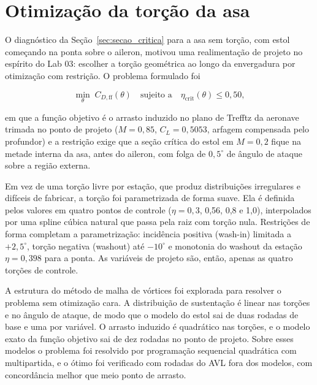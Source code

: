 \newpage
\section{Otimização da torção da asa}\label{sec:torcao}

O diagnóstico da Seção~\ref{sec:secao_critica} para a asa sem torção, com
estol começando na ponta sobre o aileron, motivou uma realimentação de
projeto no espírito do Lab 03: escolher a torção geométrica ao longo da
envergadura por otimização com restrição. O problema formulado foi

\begin{equation*}
    \min_{\theta}\; C_{D,\mathrm{ff}}(\theta)
    \quad \text{sujeito a} \quad
    \eta_{\mathrm{crit}}(\theta) \leq 0{,}50,
\end{equation*}

em que a função objetivo é o arrasto induzido no plano de Trefftz da
aeronave trimada no ponto de projeto ($M = 0{,}85$, $C_L = 0{,}5053$,
arfagem compensada pelo profundor) e a restrição exige que a seção crítica
do estol em $M = 0{,}2$ fique na metade interna da asa, antes do aileron,
com folga de $0{,}5^\circ$ de ângulo de ataque sobre a região externa.

Em vez de uma torção livre por estação, que produz distribuições
irregulares e difíceis de fabricar, a torção foi parametrizada de forma
suave. Ela é definida pelos valores em quatro pontos de controle
($\eta = 0{,}3$, 0,56, 0,8 e 1,0), interpolados por uma spline cúbica
natural que passa pela raiz com torção nula. Restrições de forma completam
a parametrização: incidência positiva (wash-in) limitada a $+2{,}5^\circ$,
torção negativa (washout) até $-10^\circ$ e monotonia do washout da
estação $\eta = 0{,}398$ para a ponta. As variáveis de projeto são, então,
apenas as quatro torções de controle.

A estrutura do método de malha de vórtices foi explorada para resolver o
problema sem otimização cara. A distribuição de sustentação é linear nas
torções e no ângulo de ataque, de modo que o modelo do estol sai de duas
rodadas de base e uma por variável. O arrasto induzido é quadrático nas
torções, e o modelo exato da função objetivo sai de dez rodadas no ponto
de projeto. Sobre esses modelos o problema foi resolvido por programação
sequencial quadrática com multipartida, e o ótimo foi verificado com
rodadas do AVL fora dos modelos, com concordância melhor que meio ponto de
arrasto.

